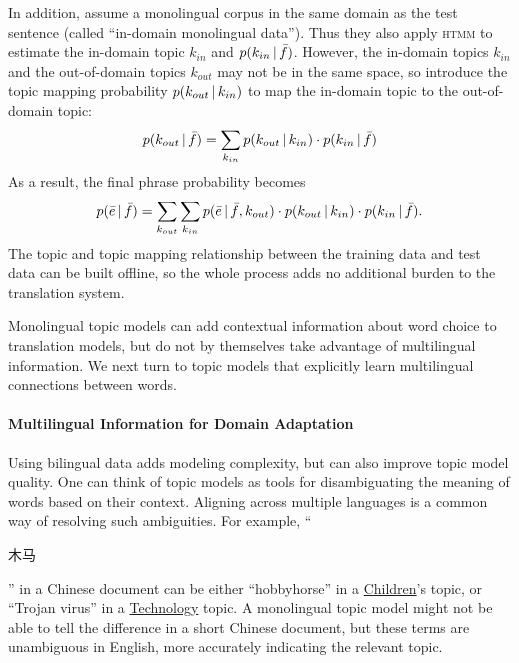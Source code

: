 In addition, \citet{su-12} assume a monolingual corpus in the
same domain as the test sentence (called ``in-domain monolingual
data''). Thus they also apply \textsc{htmm} to estimate the
in-domain topic $k_{in}$ and $p(k_{in} \, | \, \bar{f})$.  However, the
in-domain topics $k_{in}$ and the out-of-domain topics $k_{out}$ may
not be in the same space, so \citet{su-12} introduce the topic mapping
probability $p(k_{out} \, | \, k_{in})$ to map the in-domain topic to the
out-of-domain topic:
\begin{align}
p(k_{out} \, | \, \bar{f}) = \sum_{k_{in}} p(k_{out} \, | \, k_{in}) \cdot  p(k_{in} \, | \, \bar{f})
\end{align}
As a result, the final phrase probability becomes
\begin{align}
p(\bar{e} \, | \, \bar{f}) = \sum_{k_{out}} \sum_{k_{in}} p(\bar{e} \, | \, \bar{f}, k_{out}) \cdot p(k_{out} \, | \, k_{in}) \cdot p(k_{in} \, | \, \bar{f}).
\end{align}
The topic and topic mapping relationship
between the training data and test data can be built offline, so the
whole process adds no additional burden to the translation system.

Monolingual topic models can add contextual information about word choice to 
translation models, but do not by themselves take advantage of multilingual information.
We next turn to topic models that explicitly learn multilingual connections between words.

\paragraph{Multilingual Information for Domain Adaptation}

Using bilingual data adds modeling complexity, but can also improve topic model quality.
One can think of topic models as tools for disambiguating the meaning of words based on their context. 
Aligning across multiple languages is a common way of resolving such ambiguities.
 For example, ``\begin{CJK*}{UTF8}{gbsn}木马\end{CJK*}'' in a Chinese
  document can be either ``hobbyhorse'' in a \underline{Children}'s
  topic, or ``Trojan virus'' in a \underline{Technology} topic.  
  A monolingual topic model might not be able to tell the difference in a short Chinese document, but these terms
  are unambiguous in English, more accurately indicating the relevant topic.


